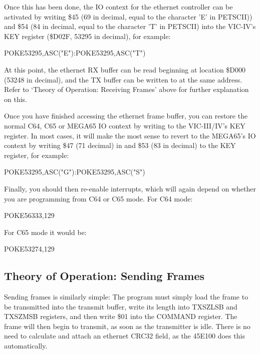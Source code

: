 Once this has been done, the IO context for the ethernet controller can be activated by writing \$45 (69 in decimal, equal to the character 'E' in PETSCII)) and \$54 (84 in decimal, equal to the character 'T' in PETSCII) into the VIC-IV's KEY register (\$D02F, 53295 in decimal), for example:

\begin{screenoutput}
POKE53295,ASC("E"):POKE53295,ASC("T")
\end{screenoutput}

At this point, the ethernet RX buffer can be read beginning at location \$D000 (53248 in decimal), and the TX buffer can be written to at the same address.  Refer to `Theory of Operation: Receiving Frames' above for further explanation on this.

Once you have finished accessing the ethernet frame buffer, you can restore the normal C64, C65 or MEGA65 IO context by writing to the VIC-III/IV's KEY register.  In most cases, it will make the most sense to revert to the MEGA65's IO context by writing \$47 (71 decimal) in and \$53 (83 in decimal) to the KEY register, for example:

\begin{screenoutput}
POKE53295,ASC("G"):POKE53295,ASC("S")
\end{screenoutput}

Finally, you should then re-enable interrupts, which will again depend on whether you are programming from C64 or C65 mode.  For C64 mode:

\begin{screenoutput}
POKE56333,129
\end{screenoutput}

For C65 mode it would be:

\begin{screenoutput}
POKE53274,129
\end{screenoutput}



\subsection{Theory of Operation: Sending Frames}

Sending frames is similarly simple: The program must simply load the frame to be transmitted into
the transmit buffer, write its length into TXSZLSB and TXSZMSB registers, and then write \$01 into
the COMMAND register.  The frame will then begin to transmit, as soon as the transmitter is idle.
There is no need to calculate and attach an ethernet CRC32 field, as the 45E100 does this automatically.

